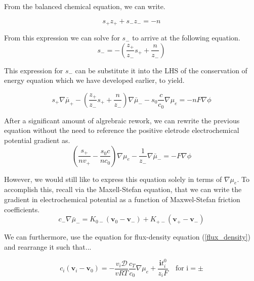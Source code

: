 \documentclass[lettersize,journal]{IEEEtran}
\begin{document}
\noindent From the balanced chemical equation, we can write.

\begin{equation}
s_{+} z_{+}+s_{-} z_{-} =-n
\end{equation}

\noindent From this expression we can solve for $s_{-} $ to arrive at the following equation.
\begin{equation}\label{signed_stoich_coef}
    s_{-} =-\left(\frac{z_{+}}{z_{-}} s_{+}+\frac{n}{z_{-}}\right)
\end{equation}

\noindent This expression for $s_{-} $ can be substitute it into the LHS of the conservation of energy equation which we have developed earlier, to yield.

\begin{equation}
{s_{+} \nabla \bar{\mu}_{+}-\left(\frac{z_{+}}{z_{-}} s_{+}+\frac{n}{z_{-}}\right) \nabla \bar{\mu}_{-}}-s_{0} \frac{c}{c_{0}} \nabla \mu_{e}=-n F \nabla \phi
\end{equation}

\noindent After a significant amount of algrebraic rework, we can rewrite the previous equation without the need to reference the positive eletrode electrochemical potential gradient as.
\begin{equation}\label{grad_mu_e_n_grad_mu_n}
\left(\frac{s_{+}}{n v_{+}}-\frac{s_{0} c}{n c_{0}}\right) \nabla \mu_{e}-\frac{1}{z_{-}} \nabla \bar{\mu}_{-}=-F \nabla \phi
\end{equation}

\noindent However, we would still like to express this equation solely in terms of $\nabla \mu_{e}$. To accomplish this, recall via the Maxell-Stefan equation, that we can write the gradient in electrochemical potential as a function of Maxwel-Stefan friction coefficients.
\begin{equation}\label{max_n_stefy}
c_{-} \nabla \bar{\mu}_{-}=K_{0-}\left(\mathbf{v}_{0}-\mathbf{v}_{-}\right)+K_{+-}\left(\mathbf{v}_{+}-\mathbf{v}_{-}\right)
\end{equation}

We can furthermore, use the equation for flux-density equation (\ref{flux_density}) and rearrange it such that...

\begin{equation}\label{flux_density}
c_{i}\left(\mathbf{v}_{i}-\mathbf{v}_{0}\right) =-\frac{v_{i} \mathscr{D}}{v R T} \frac{c_{T}}{c_{0}} \nabla \mu_{e}+\frac{\mathbf{i} t_{i}^{0}}{z_{i} F} \quad \text{for i} = \pm
\end{equation}
\end{document}

